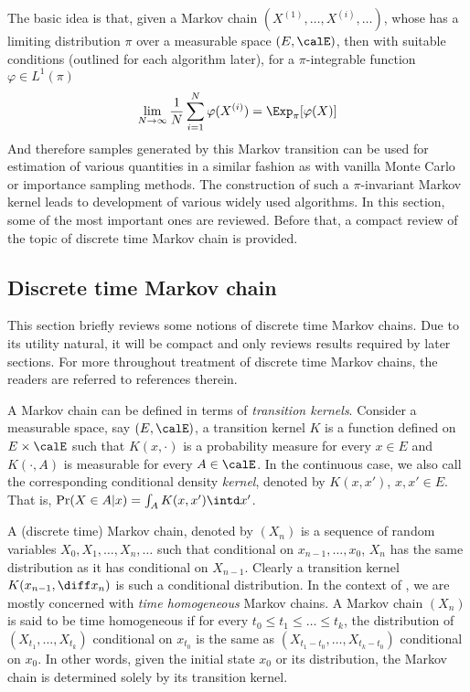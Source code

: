 The basic idea is that, given a Markov chain $(X^{(1)},\dots,X^{(i)},\dots)$,
whose has a limiting distribution $\pi$ over a measurable space $(E,\calE)$,
then with suitable conditions (outlined for each algorithm later), for a
$\pi$-integrable function $\varphi \in L^1(\pi)$
\begin{equation}
  \lim_{N\to\infty}\frac{1}{N}\sum_{i=1}^N\varphi(X^{(i)}) =
  \Exp_{\pi}[\varphi(X)]
  \label{eq:mcmc convergence}
\end{equation}
And therefore samples generated by this Markov transition can be used for
estimation of various quantities in a similar fashion as with vanilla Monte
Carlo or importance sampling methods. The construction of such a
$\pi$-invariant Markov kernel leads to development of various widely used
\mcmc algorithms. In this section, some of the most important ones are
reviewed. Before that, a compact review of the topic of discrete time Markov
chain is provided.

\subsection{Discrete time Markov chain}
\label{sub:Discrete time Markov chain}

This section briefly reviews some notions of discrete time Markov chains. Due
to its utility natural, it will be compact and only reviews results required
by later sections. For more throughout treatment of discrete time Markov
chains, the readers are referred to references therein.

A Markov chain can be defined in terms of \emph{transition kernels}. Consider
a measurable space, say $(E,\calE)$, a transition kernel $K$ is a function defined
on $E\times\calE$ such that $K(x,\cdot)$ is a probability measure for every
$x\in E$ and $K(\cdot,A)$ is measurable for every $A\in\calE$. In the
continuous case, we also call the corresponding conditional density
\emph{kernel}, denoted by $K(x,x')$, $x,x'\in E$. That is, $\Pr(X\in A|x) =
\int_A K(x,x')\intd x'$.

A (discrete time) Markov chain, denoted by $(X_n)$ is a sequence of random
variables $X_0,X_1,\dots,X_n,\dots$ such that conditional on
$x_{n-1},\dots,x_0$, $X_n$ has the same distribution as it has conditional on
$X_{n-1}$. Clearly a transition kernel $K(x_{n-1},\diff x_n)$ is such a
conditional distribution. In the context of \mcmc, we are mostly concerned
with \emph{time homogeneous} Markov chains. A Markov chain $(X_n)$ is said to
be time homogeneous if for every $t_0\le t_1\le\dots\le t_k$, the distribution
of $(X_{t_1},\dots,X_{t_k})$ conditional on $x_{t_0}$ is the same as
$(X_{t_1-t_0},\dots,X_{t_k-t_0})$ conditional on $x_0$. In other words, given
the initial state $x_0$ or its distribution, the Markov chain is determined
solely by its transition kernel.

